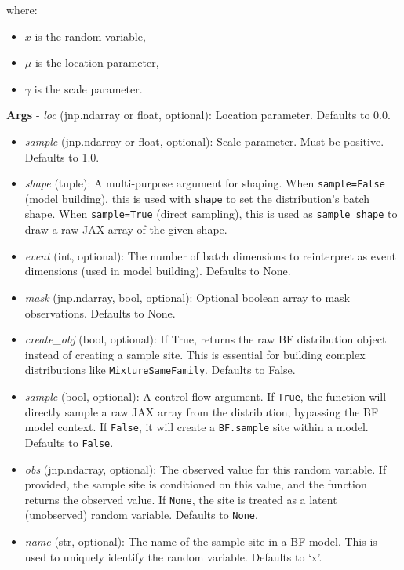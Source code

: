 \documentclass[
  letterpaper,
  DIV=11,
  numbers=noendperiod]{scrartcl}
\providecommand{\tightlist}{%
  \setlength{\itemsep}{0pt}\setlength{\parskip}{0pt}}\usepackage{longtable,booktabs,array}
\begin{document}
where:

\begin{itemize}
\tightlist
\item
  \(x\) is the random variable,
\item
  \(\mu\) is the location parameter,
\item
  \(\gamma\) is the scale parameter.
\end{itemize}

\textbf{Args} - \emph{loc} (jnp.ndarray or float, optional): Location
parameter. Defaults to 0.0.

\begin{itemize}
\item
  \emph{sample} (jnp.ndarray or float, optional): Scale parameter. Must
  be positive. Defaults to 1.0.
\item
  \emph{shape} (tuple): A multi-purpose argument for shaping. When
  \texttt{sample=False} (model building), this is used with
  \texttt{shape} to set the distribution's batch shape. When
  \texttt{sample=True} (direct sampling), this is used as
  \texttt{sample\_shape} to draw a raw JAX array of the given shape.
\item
  \emph{event} (int, optional): The number of batch dimensions to
  reinterpret as event dimensions (used in model building). Defaults to
  None.
\item
  \emph{mask} (jnp.ndarray, bool, optional): Optional boolean array to
  mask observations. Defaults to None.
\item
  \emph{create\_obj} (bool, optional): If True, returns the raw BF
  distribution object instead of creating a sample site. This is
  essential for building complex distributions like
  \texttt{MixtureSameFamily}. Defaults to False.
\item
  \emph{sample} (bool, optional): A control-flow argument. If
  \texttt{True}, the function will directly sample a raw JAX array from
  the distribution, bypassing the BF model context. If \texttt{False},
  it will create a \texttt{BF.sample} site within a model. Defaults to
  \texttt{False}.
\item
  \emph{obs} (jnp.ndarray, optional): The observed value for this random
  variable. If provided, the sample site is conditioned on this value,
  and the function returns the observed value. If \texttt{None}, the
  site is treated as a latent (unobserved) random variable. Defaults to
  \texttt{None}.
\item
  \emph{name} (str, optional): The name of the sample site in a BF
  model. This is used to uniquely identify the random variable. Defaults
  to `x'.
\end{itemize}
\end{document}
